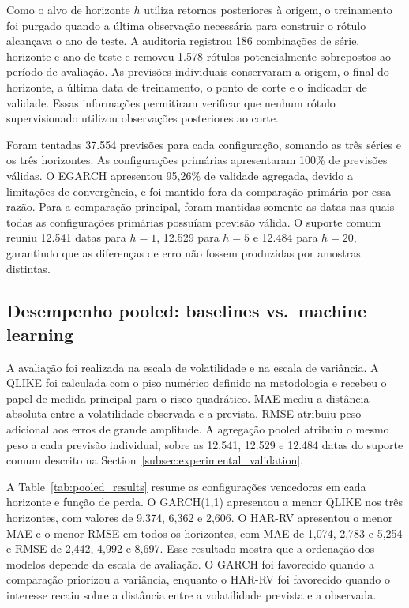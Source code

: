 \documentclass[a4paper,fleqn]{cas-sc}
\begin{document}
Como o alvo de horizonte \(h\) utiliza retornos posteriores à origem, o treinamento foi purgado quando a última observação necessária para construir o rótulo alcançava o ano de teste. A auditoria registrou 186 combinações de série, horizonte e ano de teste e removeu 1.578 rótulos potencialmente sobrepostos ao período de avaliação. As previsões individuais conservaram a origem, o final do horizonte, a última data de treinamento, o ponto de corte e o indicador de validade. Essas informações permitiram verificar que nenhum rótulo supervisionado utilizou observações posteriores ao corte.

Foram tentadas 37.554 previsões para cada configuração, somando as três séries e os três horizontes. As configurações primárias apresentaram 100\% de previsões válidas. O EGARCH apresentou 95,26\% de validade agregada, devido a limitações de convergência, e foi mantido fora da comparação primária por essa razão. Para a comparação principal, foram mantidas somente as datas nas quais todas as configurações primárias possuíam previsão válida. O suporte comum reuniu 12.541 datas para \(h=1\), 12.529 para \(h=5\) e 12.484 para \(h=20\), garantindo que as diferenças de erro não fossem produzidas por amostras distintas.

\subsection{Desempenho pooled: baselines vs.\ machine learning}
\label{subsec:results_coverage}

A avaliação foi realizada na escala de volatilidade e na escala de variância. A QLIKE foi calculada com o piso numérico definido na metodologia e recebeu o papel de medida principal para o risco quadrático. MAE mediu a distância absoluta entre a volatilidade observada e a prevista. RMSE atribuiu peso adicional aos erros de grande amplitude. A agregação pooled atribuiu o mesmo peso a cada previsão individual, sobre as 12.541, 12.529 e 12.484 datas do suporte comum descrito na Section~\ref{subsec:experimental_validation}.

A Table~\ref{tab:pooled_results} resume as configurações vencedoras em cada horizonte e função de perda. O GARCH(1,1) apresentou a menor QLIKE nos três horizontes, com valores de 9,374, 6,362 e 2,606. O HAR-RV apresentou o menor MAE e o menor RMSE em todos os horizontes, com MAE de 1,074, 2,783 e 5,254 e RMSE de 2,442, 4,992 e 8,697. Esse resultado mostra que a ordenação dos modelos depende da escala de avaliação. O GARCH foi favorecido quando a comparação priorizou a variância, enquanto o HAR-RV foi favorecido quando o interesse recaiu sobre a distância entre a volatilidade prevista e a observada.
\end{document}
